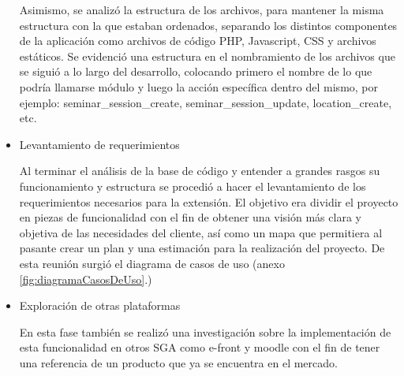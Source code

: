 \begin{itemize}
Asimismo, se analizó la estructura de los archivos, para mantener la misma estructura con la que estaban ordenados, separando los distintos componentes de la aplicación como archivos de código PHP, Javascript, \gls{CSS} y archivos estáticos. Se evidenció una estructura en el nombramiento de los archivos que se siguió a lo largo del desarrollo, colocando primero el nombre de lo que podría llamarse módulo y luego la acción específica dentro del mismo, por ejemplo: seminar\_session\_create, seminar\_session\_update, location\_create, etc.

\item Levantamiento de requerimientos

Al terminar el análisis de la base de código y entender a grandes rasgos su funcionamiento y estructura se procedió a hacer el levantamiento de los requerimientos necesarios para la extensión. El objetivo era dividir el proyecto en piezas de funcionalidad con el fin de obtener una visión más clara y objetiva de las necesidades del cliente, así como un mapa que permitiera al pasante crear un plan y una estimación para la realización del proyecto. De esta reunión surgió el diagrama de casos de uso (anexo \ref{fig:diagramaCasosDeUso}.)

\item Exploración de otras plataformas

En esta fase también se realizó una investigación sobre la implementación de esta funcionalidad en otros SGA como e-front y moodle con el fin de tener una referencia de un producto que ya se encuentra en el mercado.

\end{itemize}






